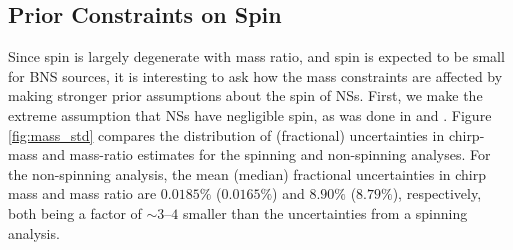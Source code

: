 \subsection{Prior Constraints on Spin}
\label{subsec:prior_constraints}

Since spin is largely degenerate with mass ratio, and spin is expected to be small for BNS sources, it is interesting to ask how the mass constraints are affected by making stronger prior assumptions about the spin of NSs.  First, we make the extreme assumption that NSs have negligible spin, as was done in \citet{Singer_2014} and \citet{Berry_2014}.  Figure \ref{fig:mass_std} compares the distribution of (fractional) uncertainties in chirp-mass and mass-ratio estimates for the spinning and non-spinning analyses. For the non-spinning analysis, the mean (median) fractional uncertainties in chirp mass and mass ratio are $0.0185\%$ ($0.0165\%$) and $8.90\%$ ($8.79\%$), respectively, both being a factor of $\sim3$--$4$ smaller than the uncertainties from a spinning analysis.
  
  
  
  
  
  
  
  
  
  
  